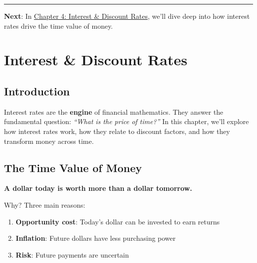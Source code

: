 \documentclass[
  letterpaper,
]{scrbook}
\providecommand{\tightlist}{%
  \setlength{\itemsep}{0pt}\setlength{\parskip}{0pt}}
\begin{document}
\begin{center}\rule{0.5\linewidth}{0.5pt}\end{center}

\textbf{Next}: In \href{interest_rates.qmd}{Chapter 4: Interest \&
Discount Rates}, we'll dive deep into how interest rates drive the time
value of money.


\chapter{Interest \& Discount Rates}\label{interest-discount-rates}

\section{Introduction}\label{introduction-3}

Interest rates are the \textbf{engine} of financial mathematics. They
answer the fundamental question: \emph{``What is the price of time?''}
In this chapter, we'll explore how interest rates work, how they relate
to discount factors, and how they transform money across time.

\section{The Time Value of Money}\label{the-time-value-of-money}

\begin{tcolorbox}[enhanced jigsaw, toptitle=1mm, colbacktitle=quarto-callout-note-color!10!white, opacityback=0, leftrule=.75mm, breakable, colframe=quarto-callout-note-color-frame, toprule=.15mm, opacitybacktitle=0.6, coltitle=black, bottomrule=.15mm, colback=white, arc=.35mm, titlerule=0mm, rightrule=.15mm, left=2mm, title=\textcolor{quarto-callout-note-color}{\faInfo}\hspace{0.5em}{Core Principle: Time Value of Money}, bottomtitle=1mm]

\textbf{A dollar today is worth more than a dollar tomorrow.}

Why? Three main reasons:

\begin{enumerate}
\def\labelenumi{\arabic{enumi}.}
\tightlist
\item
  \textbf{Opportunity cost}: Today's dollar can be invested to earn
  returns
\item
  \textbf{Inflation}: Future dollars have less purchasing power
\item
  \textbf{Risk}: Future payments are uncertain
\end{enumerate}

\end{tcolorbox}
\end{document}
